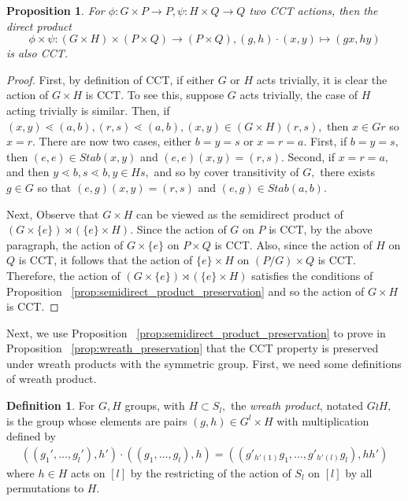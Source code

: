 \documentclass[10 pt]{amsart}
\theoremstyle{plain}
\newtheorem{prop}[thm]{Proposition}
\theoremstyle{definition}
\newtheorem{defn}[thm]{Definition}
\theoremstyle{remark}
\numberwithin{equation}{section}
\begin{document}
\begin{prop}
\label{prop:direct_product_preservation}
For $\phi:G\times P\rightarrow P,\psi:H \times Q \rightarrow Q$ two CCT actions, then the direct product 
$$\phi \times \psi:(G\times H)\times (P\times Q) \rightarrow (P\times Q),(g,h)\cdot (x,y) \mapsto (gx,hy)$$
is also CCT.
\end{prop}
\begin{proof}
First, by definition of CCT, if either $G$ or $H$ acts trivially, it is clear the action of $G\times H$ is CCT. To see this, suppose $G$ acts trivially, the case of $H$ acting trivially is similar. Then, if $(x,y) \lessdot (a,b),(r,s)\lessdot (a,b),(x,y) \in (G\times H)(r,s),$ then $x \in Gr$ so $x = r.$ There are now two cases, either $b = y = s$ or $x = r = a.$ First, if $b = y = s,$ then $(e,e) \in Stab(x,y)$ and $(e,e)(x,y) = (r,s).$ Second, if $x = r = a,$ and then $y \lessdot b,s \lessdot b,y \in Hs,$ and so by cover transitivity of $G,$ there exists $g \in G$ so that $(e,g)(x,y) = (r,s)$ and $(e,g) \in Stab(a,b).$

Next, Observe that $G \times H$ can be viewed as the semidirect product of $(G\times \{e\}) \rtimes (\{e\} \times H).$ Since the action of $G$ on $P$ is CCT, by the above paragraph, the action of $G\times \{e\}$ on $P \times Q$ is CCT. Also, since the action of $H$ on $Q$ is CCT, it follows that the action of $\{e\}\times H$ on $(P/G) \times Q$ is CCT. Therefore, the action of $(G\times \{e\}) \rtimes (\{e\} \times H)$ satisfies the conditions of Proposition ~\ref{prop:semidirect_product_preservation} and so the action of $G\times H$ is CCT.
\end{proof}

Next, we use Proposition ~\ref{prop:semidirect_product_preservation} to prove in Proposition ~\ref{prop:wreath_preservation} that the CCT property is preserved under wreath products with the symmetric group. First, we need some definitions of wreath product.

\begin{defn}
For $G, H$ groups, with $H \subset S_l,$ the {\it wreath product}, notated $G \wr H,$ is the group whose elements are pairs $(g,h) \in G^l\times H$ with multiplication defined by
\begin{align*}
((g_1',\ldots, g_l'),h') \cdot ((g_1,\ldots, g_l) ,h) =((g'_{h'(1)}g_1,\ldots, g'_{h'(l)}g_l),hh')
\end{align*}
where $h \in H$ acts on $[l]$ by the restricting of the action of $S_l$ on $[l]$ by all permutations to $H.$
\end{defn}
\end{document}
